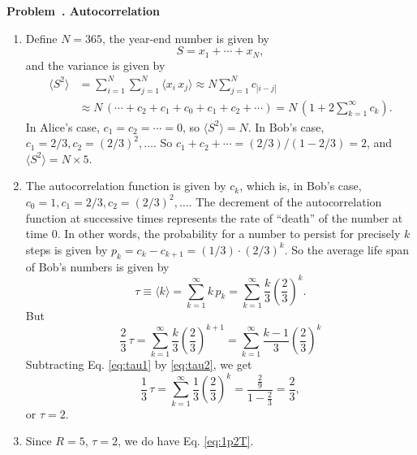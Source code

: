 \documentclass[12pt]{article}
\newcounter{problem}[section]
\newenvironment{problem}[1]
{
  \refstepcounter{problem}\par\bigskip
  \textbf{\large Problem~\theproblem. #1}
  \par\medskip
}
{ \medskip }
\begin{document}
\begin{problem}{Autocorrelation}
\begin{enumerate}
  \item
    Define $N = 365$, the year-end number is given by
    $$
    S = x_1 + \cdots + x_N
    ,
    $$
    and the variance is given by
    $$
    \begin{aligned}
    \langle S^2 \rangle
    &=
    \sum_{i = 1}^N \sum_{j = 1}^N
    \langle x_i \, x_j \rangle
    \approx
    N \sum_{j = 1}^N
    c_{|i - j|}
    \\
    &\approx
    N \, ( \cdots + c_2 + c_1 + c_0 + c_1 + c_2 + \cdots )
    =
    N \, \left( 1 + 2 \sum_{k=1}^\infty c_k \right)
    .
    \end{aligned}
    $$
    In Alice's case, $c_1 = c_2 = \cdots = 0$,
    so $\langle S^2 \rangle = N$.
    In Bob's case,
    $c_1 = 2/3, c_2 = (2/3)^2, \dots$.
    So
    $c_1 + c_2 + \cdots = (2/3) / (1 - 2/3) = 2$,
    and
    $\langle S^2 \rangle = N \times 5$.

  \item
    The autocorrelation function is given by $c_k$,
    which is, in Bob's case,
    $c_0 = 1, c_1 = 2/3, c_2 = (2/3)^2, \dots$.
    The decrement of the autocorrelation function
    at successive times represents
    the rate of ``death'' of the number at time $0$.
    In other words, the probability for a number
    to persist for precisely $k$ steps is given by
    $p_k = c_k - c_{k+1} = (1/3) \cdot (2/3)^k $.
    So the average life span of Bob's numbers is given by
    \begin{equation}
    \tau \equiv \langle k \rangle
    = \sum_{k = 1}^\infty k \, p_k
    = \sum_{k = 1}^\infty \frac{ k } { 3 } \left( \frac{2}{3} \right)^k
    .
    \label{eq:tau1}
    \end{equation}
    But
    \begin{equation}
    \frac{2}{3} \, \tau
    = \sum_{k = 1}^\infty \frac{ k } { 3 } \left( \frac{2}{3} \right)^{k+1}
    = \sum_{k = 1}^\infty \frac{ k - 1} { 3 } \left( \frac{2}{3} \right)^{k}
    \label{eq:tau2}
    \end{equation}
    Subtracting Eq. \eqref{eq:tau1} by \eqref{eq:tau2}, we get
    $$
    \frac{1}{3} \, \tau
    = \sum_{k = 1}^\infty \frac{ 1} { 3 } \left( \frac{2}{3} \right)^{k}
    = \frac{ \frac{2}{9} } { 1 - \frac{2}{3} } = \frac{2}{3}
    ,
    $$
    or $\tau = 2$.

  \item
    Since $R = 5$, $\tau = 2$, we do have Eq. \eqref{eq:1p2T}.
\end{enumerate}
\end{problem}
\end{document}
